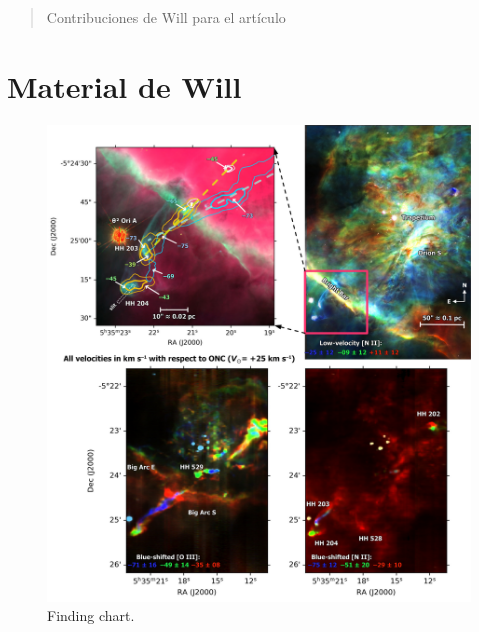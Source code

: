 \documentclass[twocolumn]{aastex63}
\begin{document}
\begin{abstract}

Contribuciones de Will para el artículo

\end{abstract}


\section{Material de Will}
\label{sec:will}

\newcommand\ha{\ensuremath{\mathrm{H\alpha}}}
\newcommand\hb{\ensuremath{\mathrm{H\beta}}}
\renewcommand{\ion}[2]{\setcounter{ionstage}{#2}%
  \ensuremath{\mathrm{#1\,\scriptstyle\Roman{ionstage}}}}
\newcommand\oiii{[\ion{O}{3}]}
\newcommand\wav[1]{\ensuremath{\lambda #1}}
\def\th#1#2{\ensuremath{\theta^{#1}\,\text{Ori~#2}}}

\begin{figure}
  \centering
  \includegraphics[width=\textwidth]{hh204-finding-chart}
  \caption{Finding chart.}
  \label{fig:hh204-finding-chart}
\end{figure}
\end{document}
